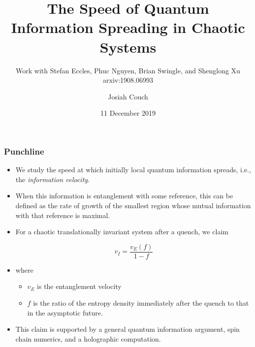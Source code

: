 \documentclass[10pt,aspectratio=169]{beamer}
\title{The Speed of Quantum Information Spreading in
Chaotic Systems}
\subtitle{Work with Stefan Eccles, Phuc Nguyen, Brian Swingle, and Shenglong Xu\\ arxiv:1908.06993}
\author{Josiah Couch}
\institute{University of Texas at Austin}
\date{11 December 2019}
\begin{document}
\begin{frame}
\titlepage

\end{frame}

\begin{frame}
\frametitle{Punchline}

\begin{itemize}

\item We study the speed at which initially local quantum information spreads, i.e., the {\it information velocity}.

\item When this information is entanglement with some reference, this can be defined as the rate of growth of the smallest region whose mutual information with that reference is maximal.

\item For a chaotic translationally invariant system after a quench, we claim

\begin{equation}
v_I = \frac{v_E(f)}{1-f}
\end{equation}

\item where

	\begin{itemize}
	
	\item $v_E$ is the entanglement velocity
	
	\item $f$ is the ratio of the entropy density immediately after the quench to that in the asymptotic future.
	
	\end{itemize}
	
\item This claim is supported by a general quantum information argument, spin chain numerics, and a holographic computation.

\end{itemize}

\end{frame}
\end{document}
